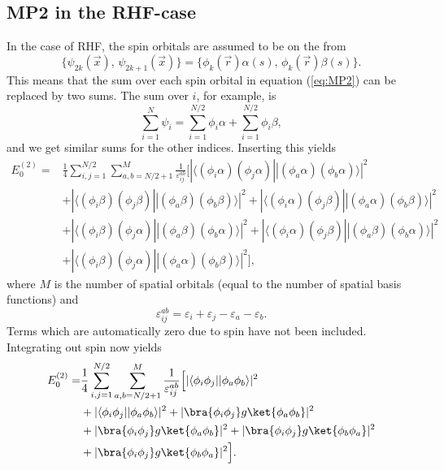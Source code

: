 \subsection{MP2 in the RHF-case}
In the case of RHF, the spin orbitals are assumed to be on the from
\begin{equation}
 \{\psi_{2k}(\vec x),\, \psi_{2k+1}(\vec x)\} = \{\phi_k(\vec r)\alpha(s),\, \phi_k(\vec r)\beta(s)\}.
\end{equation}
This means that the sum over each spin orbital in equation (\ref{eq:MP2}) can be
replaced by two sums. The sum over $i$, for example, is
\begin{equation}
 \sum_{i=1}^N\psi_i = \sum_{i=1}^{N/2}\phi_i\alpha + \sum_{i=1}^{N/2}\phi_i\beta,
\end{equation}
and we get similar sums for the other indices. Inserting this yields
\begin{equation}
\begin{split}
 E^{(2)}_0 = & \frac{1}{4}\sum_{i,j=1}^{N/2}\sum_{a,b=N/2+1}^{M}\frac{1}{\varepsilon^{ab}_{ij}}\Big[|\langle (\phi_i\alpha) (\phi_j\alpha)||(\phi_a\alpha)(\phi_b\alpha)\rangle|^2 \\
                  & + |\langle (\phi_i\beta) (\phi_j\beta)||(\phi_a\beta)(\phi_b\beta)\rangle|^2 + |\langle (\phi_i\alpha) (\phi_j\beta)||(\phi_a\alpha)(\phi_b\beta)\rangle|^2 \\
                  & + |\langle (\phi_i\beta) (\phi_j\alpha)||(\phi_a\beta)(\phi_b\alpha)\rangle|^2 + |\langle (\phi_i\alpha) (\phi_j\beta)||(\phi_a\beta)(\phi_b\alpha)\rangle|^2 \\
                  & + |\langle (\phi_i\beta) (\phi_j\alpha)||(\phi_a\alpha)(\phi_b\beta)\rangle|^2\Big],
\end{split}
\end{equation}
where $M$ is the number of spatial orbitals (equal to the number of spatial basis functions) and
\begin{equation}
 \varepsilon^{ab}_{ij} = \varepsilon_i + \varepsilon_j - \varepsilon_a - \varepsilon_b.
\end{equation}
Terms which are automatically zero due to spin have not been included. Integrating out spin now yields
\begin{equation}
 \begin{split}
  E^{(2)}_0 = & \frac{1}{4}\sum_{i,j=1}^{N/2}\sum_{a,b=N/2+1}^{M}\frac{1}{\varepsilon^{ab}_{ij}}\Big[|\langle \phi_i\phi_j||\phi_a\phi_b\rangle|^2 \\
                   & +|\langle \phi_i\phi_j||\phi_a\phi_b\rangle|^2 + |\bra{\phi_i\phi_j}g\ket{\phi_a\phi_b}|^2 \\
                   & + |\bra{\phi_i\phi_j}g\ket{\phi_a\phi_b}|^2 + |\bra{\phi_i\phi_j}g\ket{\phi_b\phi_a}|^2 \\
                   & + |\bra{\phi_i\phi_j}g\ket{\phi_b\phi_a}|^2 \Big].
 \end{split}
\end{equation}
